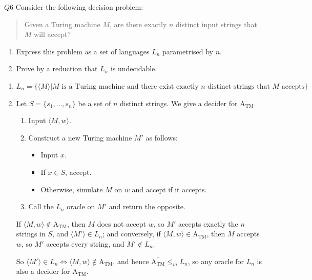 \documentclass{article}
\theoremstyle{definition}
\theoremstyle{definition}
\theoremstyle{remark}
\begin{document}
\begin{questionbox}{$Q6$}
    Consider the following decision problem:

    \begin{quote}
        Given a Turing machine $M$, are there exactly $n$ distinct input strings that $M$ will accept?
    \end{quote}
    \begin{enumerate}
        \item[$(i)$] Express this problem as a set of languages $L_n$ parametrised by $n$.
        
        \item[$(ii)$] Prove by a reduction that $L_n$ is undecidable.
    \end{enumerate}
\end{questionbox}

\bigskip

\begin{enumerate}
    \item[$(i)$] $L_n=\bigl\{\langle M\rangle\mathrel{\big|}M\text{ is a Turing machine and there exist exactly }n\text{ distinct strings that }M\text{ accepts}\bigr\}$
    
    \item[$(ii)$] Let $S=\{s_1,\ldots,s_n\}$ be a set of $n$ distinct strings. We give a decider for $\text{A}_\text{TM}$.
    \begin{enumerate}
        \item[(1)] Input $\langle M,w\rangle$.
        \item[(2)] Construct a new Turing machine $M'$ as follows:
        \begin{itemize}
            \item[(a)] Input $x$.
            \item[(b)] If $x\in S$, accept.
            \item[(c)] Otherwise, simulate $M$ on $w$ and accept if it accepts.
        \end{itemize}
        \item[(3)] Call the $L_n$ oracle on $M'$ and return the opposite.
    \end{enumerate}
    If $\langle M,w\rangle\notin\text{A}_\text{TM}$, then $M$ does not accept $w$, so $M'$ accepts exactly the $n$ strings in $S$, and $\langle M'\rangle\in L_n$; and conversely, if $\langle M,w\rangle\in\text{A}_\text{TM}$, then $M$ accepts $w$, so $M'$ accepts every string, and $M'\notin L_n$.
    
    So $\langle M'\rangle\in L_n\Longleftrightarrow\langle M,w\rangle\notin\text{A}_\text{TM}$, and hence $\overline{\text{A}_\text{TM}}\leq_m L_n$, so any oracle for $L_n$ is also a decider for $\text{A}_\text{TM}$.
\end{enumerate}
\end{document}
